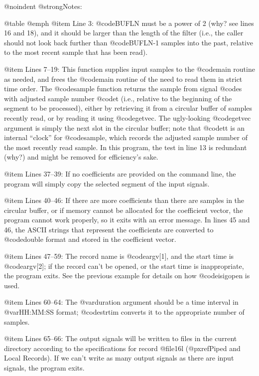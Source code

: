 {{{{{{{{{{@noindent
@strong{Notes:}

@table @emph
@item Line 3:
@code{BUFLN} must be a power of 2 (why? see lines 16 and 18), and it
should be larger than the length of the filter (i.e., the caller should
not look back further than @code{BUFLN-1} samples into the past,
relative to the most recent sample that has been read).

@item Lines 7--19:
This function supplies input samples to the @code{main} routine as
needed, and frees the @code{main} routine of the need to read them in
strict time order.  The @code{sample} function returns the sample from
signal @code{s} with adjusted sample number @code{t} (i.e., relative to
the beginning of the segment to be processed), either by retrieving it
from a circular buffer of samples recently read, or by reading it using
@code{getvec}.  The ugly-looking @code{getvec} argument is simply the
next slot in the circular buffer; note that @code{tt} is an internal
``clock'' for @code{sample}, which records the adjusted sample number of
the most recently read sample.  In this program, the test in line 13 is
redundant (why?)  and might be removed for efficiency's sake.

@item Lines 37--39:
If no coefficients are provided on the command line, the program will
simply copy the selected segment of the input signals.

@item Lines 40--46:
If there are more coefficients than there are samples in the circular
buffer, or if memory cannot be allocated for the coefficient vector, the
program cannot work properly, so it exits with an error message.  In
lines 45 and 46, the ASCII strings that represent the coefficients are
converted to @code{double} format and stored in the coefficient
vector.

@item Lines 47--59:
The record name is @code{argv[1]}, and the start time is @code{argv[2]};
if the record can't be opened, or the start time is inappropriate, the
program exits.  See the previous example for details on how @code{isigopen}
is used.

@item Lines 60--64:
The @var{duration} argument should be a time interval in @var{HH:MM:SS}
format; @code{strtim} converts it to the appropriate number of
samples.

@item Lines 65--66:
The output signals will be written to files in the current directory
according to the specifications for record @file{16l}
(@pxref{Piped and Local Records}).  If we can't write as many output
signals as there are input signals, the program exits.

}}}}}}}}}}
